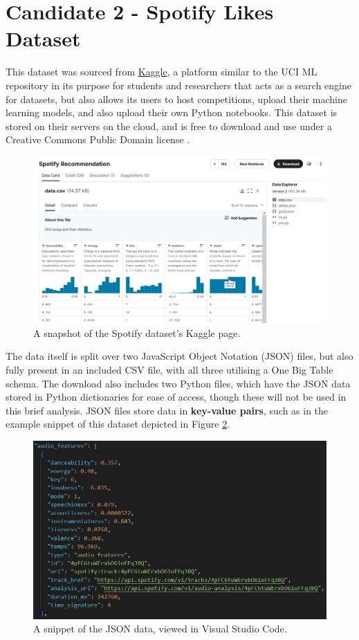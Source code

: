 \documentclass[12pt]{report}
\begin{document}
\pagebreak

\section{Candidate 2 - Spotify Likes Dataset}
This dataset \autocite{vergnou_spotify_nodate} was sourced from \href{https://www.kaggle.com/datasets}{Kaggle}, a platform similar to the UCI ML repository in its 
purpose for students and researchers that acts as a search engine for datasets, but also allows its users to host competitions, upload their machine learning models, and also upload 
their own Python notebooks. This dataset is stored on their servers on the cloud, and is free to download and use under a 
Creative Commons Public Domain license \autocite{creative_commons_deed_nodate}.

\begin{figure}[H]
    \centering
    \includegraphics[width=.75\linewidth]{Spotify-Kaggle.png}
    \caption{A snapshot of the Spotify dataset's Kaggle page.}
    \label{fig:Spotify-Kaggle}
\end{figure}

The data itself is split over 
two JavaScript Object Notation (JSON) files, but also fully present in an included CSV file, with all three utilising a One Big Table schema. The 
download also includes two Python files, which have the JSON data stored in Python dictionaries for ease of access, though these will not be used in 
this brief analysis. JSON files store data in \textbf{key-value pairs}, such as in the example snippet of this dataset depicted in Figure \ref{fig:spotifySnippet}.  

\begin{figure}[H]
    \centering
    \includegraphics[width=.75\linewidth]{spotifySnippet.png}
    \caption{A snippet of the JSON data, viewed in Visual Studio Code.}
    \label{fig:spotifySnippet}
\end{figure}
\end{document}
